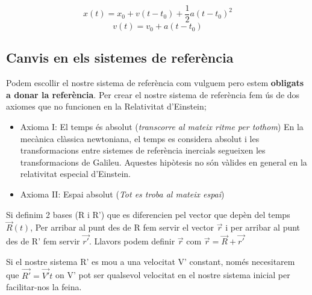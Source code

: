 \documentclass[12pt]{article}
\newcommand{\axes}[4]{%
  \draw[ax] (0,0) -- (#1,0) node[right, black] {#3};
  \draw[ax] (0,0) -- (0,#2) node[above, black] {#4};}
\begin{document}
\[x(t) = x_0 + v(t-t_0) + \frac{1}{2}a(t-t_0)^2\]
\[v(t) = v_0 + a(t-t_0)\]

\subsection{Canvis en els sistemes de referència}

Podem escollir el nostre sistema de referència com vulguem pero estem \textbf{obligats a donar la referència}. Per crear el nostre sistema de referència fem ús de dos axiomes que no funcionen en la Relativitat d'Einstein; 

\begin{itemize}
    \item Axioma I: El temps és absolut (\textit{transcorre al mateix ritme per tothom})
    En la mecànica clàssica newtoniana, el temps es considera absolut i les transformacions entre sistemes de referència inercials segueixen les transformacions de Galileu. Aquestes hipòtesis no són vàlides en general en la relativitat especial d’Einstein.
    \item Axioma II: Espai absolut (\textit{Tot es troba al mateix espai})
\end{itemize}

Si definim 2 bases (R i R') que es diferencien pel vector que depèn del temps $\vec{R}(t)$, Per arribar al punt des de R fem servir el vector $\vec{r}$ i per arribar al punt des de R' fem servir $\vec{r'}$. Llavors podem definir $\vec{r}$ com $\vec{r} = \vec{R} + \vec{r'}$

\begin{center}
\end{center}

Si el nostre sistema R' es mou a una velocitat V' constant, només necesitarem que $\vec{R'} = \vec{V'}t$ on V' pot ser qualsevol velocitat en el nostre sistema inicial per facilitar-nos la feina.
\end{document}
